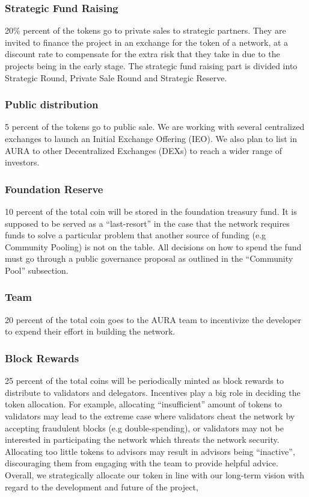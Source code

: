 \documentclass[11pt, titlepage]{article}
\begin{document}
\subsubsection{Strategic Fund Raising}
20\% percent of the tokens go to private sales to strategic partners. They are invited to finance the project in an exchange for the token of a network, at a discount rate to compensate for the extra risk that they take in due to the projects being in the early stage. The strategic fund raising part is divided into Strategic Round, Private Sale Round and Strategic Reserve.
 
\subsubsection{Public distribution}
5 percent of the tokens go to public sale. We are working with several centralized exchanges to launch an Initial Exchange Offering (IEO). We also plan to list in AURA to other Decentralized Exchanges (DEXs) to reach a wider range of investors. 

\subsubsection{Foundation Reserve}
10 percent of the total coin will be stored in the foundation treasury fund. It is supposed to be served as a “last-resort” in the case that the network requires funds to solve a particular problem that another source of funding (e.g Community Pooling) is not on the table. All decisions on how to spend the fund must go through a public governance proposal as outlined in the “Community Pool” subsection.
 
\subsubsection{Team}
20 percent of the total coin goes to the AURA team to incentivize the developer to expend their effort in building the network.
 
\subsubsection{Block Rewards}
25 percent of the total coins will be periodically minted as block rewards to distribute to validators and delegators. Incentives play a big role in deciding the token allocation. For example, allocating “insufficient” amount of tokens to validators may lead to the extreme case where validators cheat the network by accepting fraudulent blocks (e.g double-spending), or validators may not be interested in participating the network which threats the network security. Allocating too little tokens to advisors may result in advisors being “inactive”, discouraging them from engaging with the team to provide helpful advice. Overall, we strategically allocate our token in line with our long-term vision with regard to the development and future of the project, 
\end{document}
